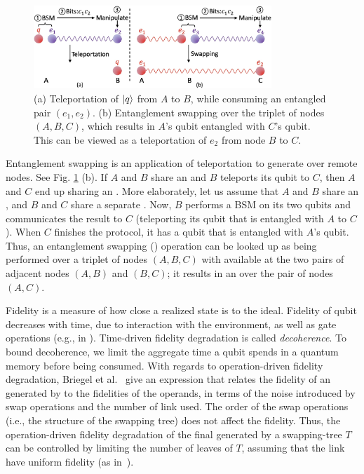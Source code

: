 \begin{figure}
    \centering
    \includegraphics[width=0.8\textwidth]{chapters/tqe/figures/teleportation_swapping.jpg}
    \caption{(a)  Teleportation of $\ket{q}$ from $A$ to $B$, while consuming an entangled pair $(e_1, e_2)$. (b) Entanglement swapping over the triplet of nodes $(A, B, C)$, which results in $A$'s qubit entangled with $C$'s qubit. This can be viewed as a teleportation of $e_2$ from node $B$ to $C$.}
  \label{fig:swapping_teleport_swap}
\end{figure}

Entanglement swapping is an application of teleportation 
to generate \epss over remote nodes. See Fig. \ref{fig:swapping_teleport_swap} (b).
If $A$ and $B$ share an \eps  and $B$ teleports its qubit to $C$, then 
 $A$ and $C$ end up sharing an \eps. 
More elaborately, let us assume that $A$ and $B$
share an \eps, and $B$ and $C$ share a separate \eps. 
Now, $B$ performs a  BSM 
on its two qubits and communicates the result to $C$ (teleporting its 
 qubit that is entangled with $A$ to $C$). When $C$ finishes the protocol, it has a qubit
that is entangled with $A$'s qubit. Thus, an entanglement swapping (\es)
 operation can be looked up as being performed over a triplet of nodes $(A, B, C)$ 
with \eps available 
at the 
two pairs of adjacent nodes $(A, B)$ and $(B,C)$; it results in an \eps over the pair
of nodes $(A, C)$. 

Fidelity is a measure of how close a realized state is to the ideal. 
Fidelity of qubit decreases with time, due to interaction with the environment,
as well as gate operations (e.g., in \es). 
Time-driven fidelity degradation is called \emph{decoherence}. 
To bound decoherence, we limit the aggregate time a qubit spends in a 
quantum memory before being consumed.
With regards to operation-driven fidelity degradation, 
Briegel et al.~\cite{BreigelEtAl1998} give an expression 
that relates the fidelity of an \eps generated by \es 
to the fidelities of the operands,  in terms of the 
noise introduced by swap operations and the number of link \epss used. The order of the swap operations (i.e., the structure of the 
swapping tree) does not affect the fidelity. 
Thus, the operation-driven fidelity degradation of the final \eps 
generated by a swapping-tree $T$
can be controlled by limiting the number of leaves of $T$, assuming that
the link \epss have uniform fidelity (as in~\cite{delft-lp}).

